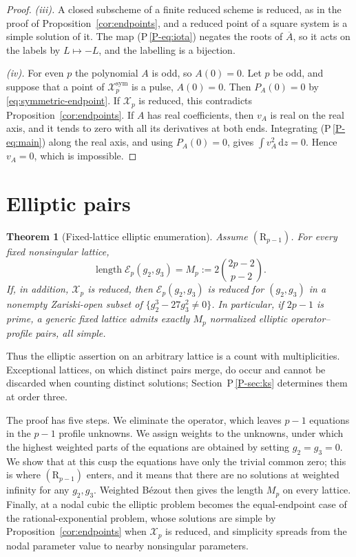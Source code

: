\documentclass[11pt]{article}
\newtheorem{theorem}{Theorem}[section]
\newcommand{\len}{\operatorname{length}}
\newcommand{\Xp}{\mathcal X_p}
\newcommand{\dd}{\,\mathrm d}
\numberwithin{equation}{section}
\begin{document}
\begin{proof}
\emph{(iii).} A closed subscheme of a finite reduced scheme is reduced,
as in the proof of Proposition~\ref{cor:endpoints}, and a reduced point
of a square system is a simple solution of it. The map
(P\,\ref{P-eq:iota}) negates the roots of \(\overline A\), so it acts on the
labels by \(L\mapsto-L\), and the labelling is a bijection.

\emph{(iv).} For even \(p\) the polynomial \(A\) is odd, so \(A(0)=0\).
Let \(p\) be odd, and suppose that a point of \(\Xp^{\mathrm{sym}}\) is
a pulse, \(A(0)=0\). Then \(P_A(0)=0\) by
\eqref{eq:symmetric-endpoint}. If \(\Xp\) is reduced, this contradicts
Proposition~\ref{cor:endpoints}. If \(A\) has real coefficients, then
\(v_A\) is real on the real axis, and it tends to zero with all its
derivatives at both ends. Integrating (P\,\ref{P-eq:main}) along the real
axis, and using \(P_A(0)=0\), gives \(\int v_A^2\dd z=0\). Hence
\(v_A=0\), which is impossible.
\end{proof}


\section{Elliptic pairs}

\begin{theorem}[Fixed-lattice elliptic enumeration]\label{thm:elliptic-count}
Assume \((\mathrm R_{p-1})\).
For every fixed nonsingular lattice,
\begin{equation}\label{eq:elliptic-length}
 \len\mathcal E_p(g_2,g_3)
   =M_p:=2\binom{2p-2}{p-2}.
\end{equation}
If, in addition, \(\Xp\) is reduced, then
\(\mathcal E_p(g_2,g_3)\) is reduced for
\((g_2,g_3)\) in a nonempty Zariski-open subset of
\(\{g_2^3-27g_3^2\ne0\}\).
In particular, if \(2p-1\) is prime, a generic fixed lattice
admits exactly \(M_p\) normalized elliptic operator--profile
pairs, all simple.
\end{theorem}

Thus the elliptic assertion on an arbitrary lattice is a count
with multiplicities. Exceptional lattices, on which distinct pairs
merge, do occur and cannot be discarded when counting distinct
solutions; Section~P\,\ref{P-sec:ks} determines them at order three.

The proof has five steps. We eliminate the operator, which leaves
\(p-1\) equations in the \(p-1\) profile unknowns. We assign weights to the unknowns, under which the highest weighted
parts of the equations are obtained by setting \(g_2=g_3=0\). We show
that at this cusp the equations have only the trivial common zero;
this is where \((\mathrm R_{p-1})\) enters, and it means that there
are no solutions at weighted infinity for any \(g_2,g_3\). Weighted B\'ezout then gives the length \(M_p\) on every
lattice. Finally, at a nodal cubic the elliptic problem becomes the
equal-endpoint case of the rational-exponential problem, whose
solutions are simple by Proposition~\ref{cor:endpoints} when \(\Xp\)
is reduced, and simplicity spreads from the nodal parameter value to
nearby nonsingular parameters.
\end{document}
